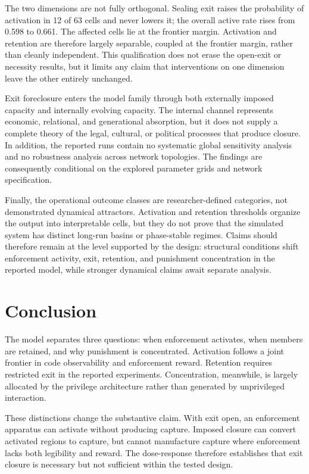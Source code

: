 \documentclass[12pt]{article}
\begin{document}
The two dimensions are not fully orthogonal. Sealing exit raises the probability of activation in 12 of 63 cells and never lowers it; the overall active rate rises from 0.598 to 0.661. The affected cells lie at the frontier margin. Activation and retention are therefore largely separable, coupled at the frontier margin, rather than cleanly independent. This qualification does not erase the open-exit or necessity results, but it limits any claim that interventions on one dimension leave the other entirely unchanged.

Exit foreclosure enters the model family through both externally imposed capacity and internally evolving capacity. The internal channel represents economic, relational, and generational absorption, but it does not supply a complete theory of the legal, cultural, or political processes that produce closure. In addition, the reported runs contain no systematic global sensitivity analysis and no robustness analysis across network topologies. The findings are consequently conditional on the explored parameter grids and network specification.

Finally, the operational outcome classes are researcher-defined categories, not demonstrated dynamical attractors. Activation and retention thresholds organize the output into interpretable cells, but they do not prove that the simulated system has distinct long-run basins or phase-stable regimes. Claims should therefore remain at the level supported by the design: structural conditions shift enforcement activity, exit, retention, and punishment concentration in the reported model, while stronger dynamical claims await separate analysis.

\section{Conclusion}

The model separates three questions: when enforcement activates, when members are retained, and why punishment is concentrated. Activation follows a joint frontier in code observability and enforcement reward. Retention requires restricted exit in the reported experiments. Concentration, meanwhile, is largely allocated by the privilege architecture rather than generated by unprivileged interaction.

These distinctions change the substantive claim. With exit open, an enforcement apparatus can activate without producing capture. Imposed closure can convert activated regions to capture, but cannot manufacture capture where enforcement lacks both legibility and reward. The dose-response therefore establishes that exit closure is necessary but not sufficient within the tested design.
\end{document}
